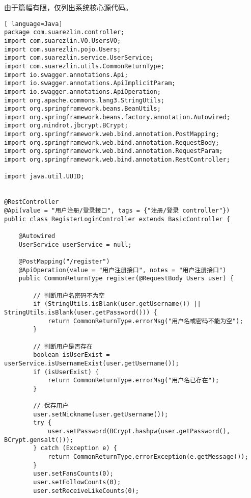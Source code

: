 
由于篇幅有限，仅列出系统核心源代码。



\begin{lstlisting}[ language=Java]
package com.suarezlin.controller;
import com.suarezlin.VO.UsersVO;
import com.suarezlin.pojo.Users;
import com.suarezlin.service.UserService;
import com.suarezlin.utils.CommonReturnType;
import io.swagger.annotations.Api;
import io.swagger.annotations.ApiImplicitParam;
import io.swagger.annotations.ApiOperation;
import org.apache.commons.lang3.StringUtils;
import org.springframework.beans.BeanUtils;
import org.springframework.beans.factory.annotation.Autowired;
import org.mindrot.jbcrypt.BCrypt;
import org.springframework.web.bind.annotation.PostMapping;
import org.springframework.web.bind.annotation.RequestBody;
import org.springframework.web.bind.annotation.RequestParam;
import org.springframework.web.bind.annotation.RestController;

import java.util.UUID;


@RestController
@Api(value = "用户注册/登录接口", tags = {"注册/登录 controller"})
public class RegisterLoginController extends BasicController {

    @Autowired
    UserService userService = null;

    @PostMapping("/register")
    @ApiOperation(value = "用户注册接口", notes = "用户注册接口")
    public CommonReturnType register(@RequestBody Users user) {

        // 判断用户名密码不为空
        if (StringUtils.isBlank(user.getUsername()) || StringUtils.isBlank(user.getPassword())) {
            return CommonReturnType.errorMsg("用户名或密码不能为空");
        }

        // 判断用户是否存在
        boolean isUserExist = userService.isUsernameExist(user.getUsername());
        if (isUserExist) {
            return CommonReturnType.errorMsg("用户名已存在");
        }

        // 保存用户
        user.setNickname(user.getUsername());
        try {
            user.setPassword(BCrypt.hashpw(user.getPassword(), BCrypt.gensalt()));
        } catch (Exception e) {
            return CommonReturnType.errorException(e.getMessage());
        }
        user.setFansCounts(0);
        user.setFollowCounts(0);
        user.setReceiveLikeCounts(0);


\end{lstlisting}
